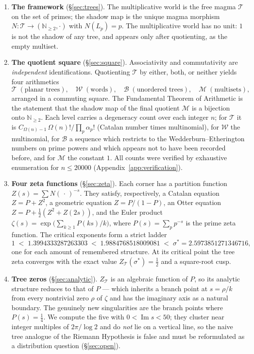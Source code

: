 \documentclass[11pt]{article}
\newcommand{\cT}{\mathcal{T}}   %
\newcommand{\cW}{\mathcal{W}}   %
\newcommand{\cB}{\mathcal{B}}   %
\newcommand{\cM}{\mathcal{M}}   %
\newcommand{\NN}{\mathbb{N}}
\numberwithin{equation}{section}
\theoremstyle{plain}
\theoremstyle{definition}
\theoremstyle{remark}
\begin{document}
\begin{enumerate}
\item \textbf{The framework} (\S\ref{sec:trees}). The multiplicative world is the free
magma $\cT$ on the set of primes; the shadow map is the unique magma morphism
$N\colon \cT \to (\NN_{\ge2},\cdot)$ with $N(L_p) = p$. The multiplicative world has no
unit: $1$ is not the shadow of any tree, and appears only after quotienting, as the
empty multiset.

\item \textbf{The quotient square} (\S\ref{sec:square}). Associativity and commutativity
are \emph{independent} identifications. Quotienting $\cT$ by either, both, or neither
yields four arithmetics
\[
\cT \;(\text{planar trees}), \quad
\cW \;(\text{words}), \quad
\cB \;(\text{unordered trees}), \quad
\cM \;(\text{multisets}),
\]
arranged in a commuting square. The Fundamental Theorem of Arithmetic is the statement
that the shadow map of the final quotient $\cM$ is a bijection onto $\NN_{\ge2}$. Each
level carries a degeneracy count over each integer $n$; for $\cT$ it is
$C_{\Omega(n)-1}\,\Omega(n)!/\prod_p \alpha_p!$ (Catalan number times multinomial), for
$\cW$ the multinomial, for $\cB$ a sequence which restricts to the
Wedderburn--Etherington numbers on prime powers and which appears not to have been
recorded before, and for $\cM$ the constant $1$. All counts were verified by exhaustive
enumeration for $n \le 20000$ (Appendix~\ref{app:verification}).

\item \textbf{Four zeta functions} (\S\ref{sec:zeta}). Each corner has a partition
function $Z(s) = \sum N(\,\cdot\,)^{-s}$. They satisfy, respectively, a Catalan equation
$Z = P + Z^2$, a geometric equation $Z = P/(1-P)$, an Otter equation
$Z = P + \tfrac12(Z^2 + Z(2s))$, and the Euler product
$\zeta(s) = \exp\bigl(\sum_{k\ge1} P(ks)/k\bigr)$, where
$P(s) = \sum_p p^{-s}$ is the prime zeta function. The critical exponents form a strict
ladder
\[
1 \;<\; 1.3994333287263303 \;<\; 1.9884768518009081 \;<\; \sigma^{*} = 2.5973851271346716,
\]
one for each amount of remembered structure. At its critical point the tree zeta
converges with the exact value $Z_\cT(\sigma^{*}) = \tfrac12$ and a square-root cusp.

\item \textbf{Tree zeros} (\S\ref{sec:analytic}). $Z_\cT$ is an algebraic function of
$P$, so its analytic structure reduces to that of $P$ --- which inherits a branch point
at $s = \rho/k$ from every nontrivial zero $\rho$ of $\zeta$ and has the imaginary axis
as a natural boundary. The genuinely new singularities are the branch points where
$P(s) = \tfrac14$. We compute the five with $0 < \operatorname{Im} s < 50$; they cluster
near integer multiples of $2\pi/\log 2$ and do \emph{not} lie on a vertical line, so the
naive tree analogue of the Riemann Hypothesis is false and must be reformulated as a
distribution question (\S\ref{sec:open}).


\end{enumerate}
\end{document}

